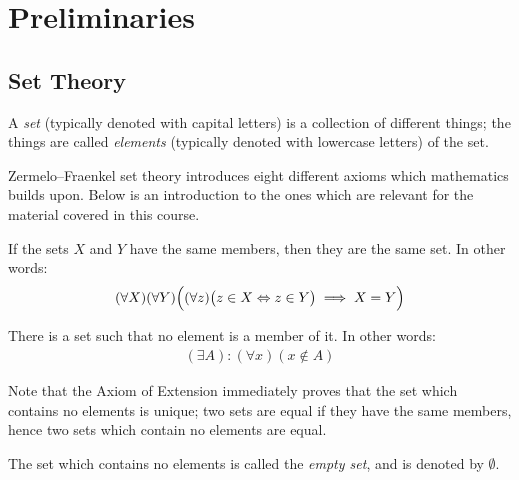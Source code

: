 \chapter{Preliminaries}
\section{Set Theory}

    \begin{definition}
        A \textit{set} (typically denoted with capital letters) is a collection of different things; the things are called \textit{elements} (typically denoted with lowercase letters) of the set.
    \end{definition}

    Zermelo–Fraenkel set theory introduces eight different axioms which mathematics builds upon. Below is an introduction to the ones which are relevant for the material covered in this course.

    \begin{axiom}
        If the sets $X$ and $Y$ have the same members, then they are the same set. In other words:
            \begin{equation*}
            \begin{split}
                (\forall X)(\forall Y)\Bigl((\forall z)\bigl(z \in X \Leftrightarrow z \in Y\bigr) \implies X = Y\Bigr)
            \end{split}
            \end{equation*}
    \end{axiom}

    \begin{axiom}
        There is a set such that no element is a member of it. In other words:
            \begin{equation*}
            \begin{split}
                (\exists A):(\forall x)(x \not\in A)
            \end{split}
            \end{equation*}
    \end{axiom}

    Note that the Axiom of Extension immediately proves that the set which contains no elements is unique; two sets are equal if they have the same members, hence two sets which contain no elements are equal.

    \begin{definition}
        The set which contains no elements is called the \textit{empty set}, and is denoted by $\emptyset$.
    \end{definition}

